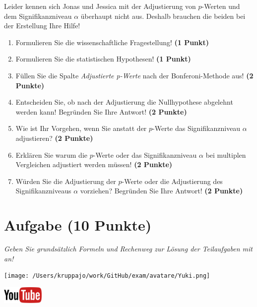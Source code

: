 \documentclass[a4paper, 9pt]{scrartcl}\usepackage[]{graphicx}\usepackage[]{xcolor}
\begin{document}
Leider kennen sich Jonas und Jessica mit der Adjustierung von $p$-Werten und dem Signifikanzniveau $\alpha$ überhaupt nicht aus. Deshalb brauchen die beiden bei der Erstellung Ihre Hilfe!

\begin{enumerate}
  \item Formulieren Sie die wissenschaftliche Fragestellung! \textbf{(1 Punkt)}
  \item Formulieren Sie die statistischen Hypothesen! \textbf{(1 Punkt)}
\item Füllen Sie die Spalte \textit{Adjustierte p-Werte} nach der Bonferoni-Methode aus! \textbf{(2 Punkte)}
\item Entscheiden Sie, ob nach der Adjustierung die Nullhypothese abgelehnt werden kann! Begründen Sie Ihre Antwort! \textbf{(2 Punkte)}
\item Wie ist Ihr Vorgehen, wenn Sie anstatt der $p$-Werte das Signifikanzniveau $\alpha$ adjustieren? \textbf{(2 Punkte)}
\item Erklären Sie warum die $p$-Werte oder das Signifikanzniveau $\alpha$ bei multiplen Vergleichen adjustiert werden müssen! \textbf{(2 Punkte)}
\item Würden Sie die Adjustierung der $p$-Werte oder die Adjustierung des Signifikanzniveaus $\alpha$ vorziehen? Begründen Sie Ihre Antwort! \textbf{(2 Punkte)}
\end{enumerate}


 
\clearpage

\section{Aufgabe \hfill (10 Punkte)}

\textit{Geben Sie grundsätzlich Formeln und Rechenweg zur Lösung der Teilaufgaben mit an!} \\[1Ex]
 

 
\begin{minipage}[t]{0.5\textwidth}
\texttt{[image: /Users/kruppajo/work/GitHub/exam/avatare/Yuki.png]}
\end{minipage}
\begin{minipage}[t]{0.5\textwidth}
\hfill
\href{https://youtu.be/xq29O8qDrg0}{\includegraphics[width = 2cm]{img/youtube}}
\end{minipage}
\vspace{1ex}
\end{document}
